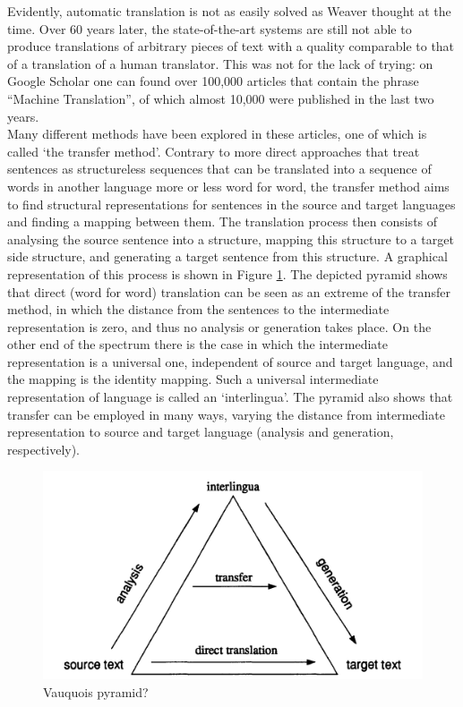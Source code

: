 \documentclass[a4paper, 11pt]{report}
\theoremstyle{definition}
\theoremstyle{plain}
\begin{document}
Evidently, automatic translation is not as easily solved as Weaver thought at the time. Over 60 years later, the state-of-the-art systems are still not able to produce translations of arbitrary pieces of text with a quality comparable to that of a translation of a human translator. This was not for the lack of trying: on Google Scholar one can found over 100,000 articles that contain the phrase ``Machine Translation'', of which almost 10,000 were published in the last two years.\\
Many different methods have been explored in these articles, one of which is called `the transfer method'. Contrary to more direct approaches that treat sentences as structureless sequences that can be translated into a sequence of words in another language more or less word for word, the transfer method aims to find structural representations for sentences in the source and target languages and finding a mapping between them. The translation process then consists of analysing the source sentence into a structure, mapping this structure to a target side structure, and generating a target sentence from this structure. A graphical representation of this process is shown in Figure \ref{fig:triangle}. The depicted pyramid shows that direct (word for word) translation can be seen as an extreme of the transfer method, in which the distance from the sentences to the intermediate representation is zero, and thus no analysis or generation takes place. On the other end of the spectrum there is the case in which the intermediate representation is a universal one, independent of source and target language, and the mapping is the identity mapping. Such a universal intermediate representation of language is called an `interlingua'. The pyramid also shows that transfer can be employed in many ways, varying the distance from intermediate representation to source and target language (analysis and generation, respectively). 


\begin{figure}[!ht]
\includegraphics[scale=0.2]{translation_triangle.png}
\caption{Vauquois pyramid?}\label{fig:triangle}
\end{figure}
\end{document}
